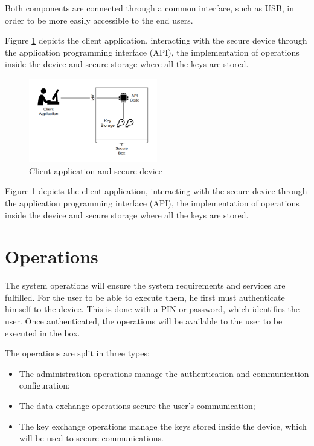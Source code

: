 Both components are connected through a common interface, such as USB, in order to be more easily accessible to the end users.

Figure \ref{fig:securebox} depicts the client application, interacting with the secure device through the application programming interface (API), the implementation of operations inside the device and secure storage where all the keys are stored.

\begin{figure}[h]
    \centering
    \includegraphics[width=0.5\textwidth]{./Images/securebox.png}
    \caption{Client application and secure device}
    \label{fig:securebox}
\end{figure}

Figure \ref{fig:securebox} depicts the client application, interacting with the secure device through the application programming interface (API), the implementation of operations inside the device and secure storage where all the keys are stored.

\section{Operations} \label{chap:arch:operations}

The system operations will ensure the system requirements and services are fulfilled.
For the user to be able to execute them, he first must authenticate himself to the device. This is done with a PIN or password, which identifies the user. Once authenticated, the operations will be available to the user to be executed in the box.

The operations are split in three types:
\begin{itemize}
    \item The administration operations manage the authentication and communication configuration;
    \item The data exchange operations secure the user's communication;
    \item The key exchange operations manage the keys stored inside the device, which will be used to secure communications.
\end{itemize}

